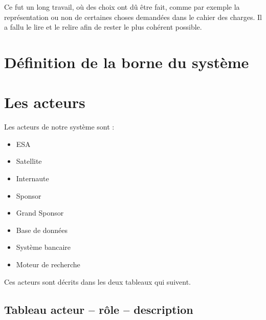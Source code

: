 \documentclass[11pt,a4paper]{article}
\begin{document}
Ce fut un long travail, où des choix ont dû être fait, 
comme par exemple la représentation ou non de certaines 
choses demandées dans le cahier des charges. Il a fallu 
le lire et le relire afin de rester le 
plus cohérent possible.

\newpage


\section{Définition de la borne du système}


\newpage


\section{Les acteurs}

Les acteurs de notre syst\`eme sont : 
\begin{itemize}
    \item ESA
    \item Satellite
    \item Internaute
    \item Sponsor
    \item Grand Sponsor
    \item Base de donn\'ees
    \item Syst\`eme bancaire
    \item Moteur de recherche \newline
\end{itemize}

Ces acteurs sont décrits dans les deux tableaux qui suivent.

\subsection{Tableau acteur -- r\^ole -- description}
\end{document}

